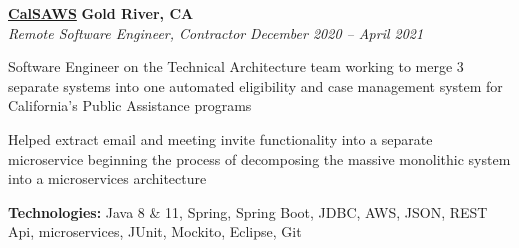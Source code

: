 %
    \headerrow
        {\textbf{\href{https://www.calsaws.org/}{CalSAWS}}}
        {\textbf{Gold River, CA}}
    \\
    \headerrow
        {\emph{Remote Software Engineer, Contractor}}
        {\emph{December 2020 -- April 2021}}
    \begin{itemize*}
        \item Software Engineer on the Technical Architecture team working to merge 3 separate systems into
            one automated eligibility and case management system for California's Public Assistance programs
        \item Helped extract email and meeting invite functionality into a separate microservice beginning the process of decomposing
            the massive monolithic system into a microservices architecture
    \end{itemize*}

    \hspace{1.0em}
        {\textbf{Technologies:} Java 8 \& 11, Spring, Spring Boot, JDBC, AWS, JSON, REST Api, microservices, JUnit, Mockito, Eclipse, Git}

